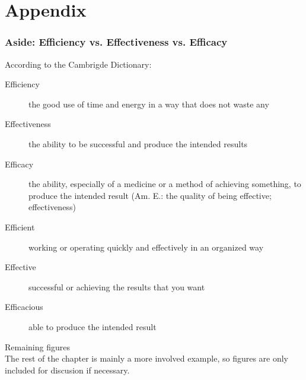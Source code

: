 \documentclass[usenames,dvipsnames,table]{beamer}
\begin{document}
\section{Appendix}
\begin{frame}
\frametitle{Aside: Efficiency vs. Effectiveness vs. Efficacy}
According to the Cambrigde Dictionary:
\begin{description}
\item[Efficiency] the good use of time and energy in a way that does not waste any
\item[Effectiveness] the ability to be successful and produce the intended results
\item[Efficacy] the ability, especially of a medicine or a method of achieving something, to produce the intended result (Am. E.: the quality of being effective; effectiveness)
\end{description}

\noindent\makebox[\linewidth]{\rule{0.95\textwidth}{0.4pt}}

\begin{description}
\item[Efficient] working or operating quickly and effectively in an organized way
\item[Effective] successful or achieving the results that you want
\item[Efficacious] able to produce the intended result 
\end{description}
\end{frame}

\begin{frame}
\begin{center}
{\huge{Remaining figures}}
\\\vspace{2em}
The rest of the chapter is mainly a more involved example, so figures are only included for discusion if necessary.
\end{center}
\end{frame}
\end{document}
